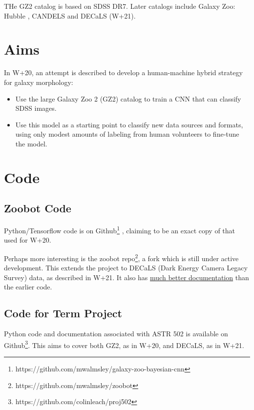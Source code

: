 \documentclass[preprint]{aastex631}
\begin{document}
THe GZ2 catalog \citep{willett_galaxy_2013, 2016MNRAS.461.3663H} is based on SDSS DR7. Later catalogs include Galaxy Zoo: Hubble \citep{2017MNRAS.464.4176W}, CANDELS \citep{2017MNRAS.464.4420S} and DECaLS (W+21).

\section{Aims}

In W+20, an attempt is described to develop a human-machine hybrid strategy for galaxy morphology:
\begin{itemize}
	\item Use the large Galaxy Zoo 2 (GZ2) catalog to train a CNN that can classify SDSS images.
	\item Use this model as a starting point to classify new data sources and formats, using only modest amounts of labeling from human volunteers to fine-tune the model.
\end{itemize}


\section{Code} \label{sec:code}

\subsection{Zoobot Code} \label{sec:zcode}

Python/Tensorflow code is on Github\footnote{https://github.com/mwalmsley/galaxy-zoo-bayesian-cnn} \citep{walmsley_mwalmsleygalaxy-zoo-bayesian-cnn_2019}, claiming to be an exact copy of that used for W+20.

Perhaps more interesting is the zoobot repo\footnote{https://github.com/mwalmsley/zoobot}, a fork which is still under active development. This extends the project to DECaLS (Dark Energy Camera Legacy Survey) data, as described in W+21. It also has \href{https://zoobot.readthedocs.io/}{much better documentation} than the earlier code.

\subsection{Code for Term Project}

Python code and documentation associated with ASTR 502 is available on Github\footnote{https://github.com/colinleach/proj502}. This aims to cover both GZ2, as in W+20, and DECaLS, as in W+21.
\end{document}
